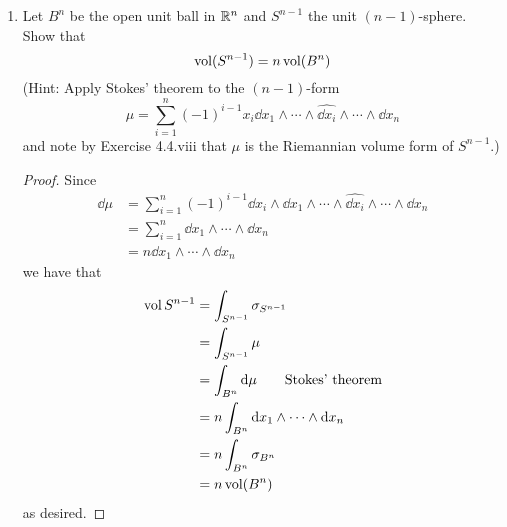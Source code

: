 \documentclass[../psets.tex]{subfiles}
\begin{document}
\begin{enumerate}[label={\textbf{4.6.\roman*.}}]
    \item Let $B^n$ be the open unit ball in $\mathbb{R}^n$ and $S^{n-1}$ the unit $(n-1)$-sphere. Show that
    \begin{equation*}
        \operatorname{vol}(S^{n-1}) = n\operatorname{vol}(B^n)
    \end{equation*}
    (Hint: Apply Stokes' theorem to the $(n-1)$-form
    \begin{equation*}
        \mu = \sum_{i=1}^n(-1)^{i-1}x_i\dd{x_1}\wedge\cdots\wedge\widehat{\dd{x_i}}\wedge\cdots\wedge\dd{x_n}
    \end{equation*}
    and note by Exercise 4.4.viii that $\mu$ is the Riemannian volume form of $S^{n-1}$.)
    \begin{proof}
        Since
        \begin{align*}
            \dd\mu &= \sum_{i=1}^n(-1)^{i-1}\dd{x_i}\wedge\dd{x_1}\wedge\cdots\wedge\widehat{\dd{x_i}}\wedge\cdots\wedge\dd{x_n}\\
            &= \sum_{i=1}^n\dd{x_1}\wedge\cdots\wedge\dd{x_n}\\
            &= n\dd{x_1}\wedge\cdots\wedge\dd{x_n}
        \end{align*}
        we have that
        \begin{align*}
            \operatorname{vol}{S^{n-1}} &= \int_{S^{n-1}}\sigma_{S^{n-1}}\\
            &= \int_{S^{n-1}}\mu\\
            &= \int_{B^n}\dd\mu\tag*{Stokes' theorem}\\
            &= n\int_{B^n}\dd{x_1}\wedge\cdots\wedge\dd{x_n}\\
            &= n\int_{B^n}\sigma_{B^n}\\
            &= n\operatorname{vol}(B^n)
        \end{align*}
        as desired.
    \end{proof}
\end{enumerate}
\end{document}
